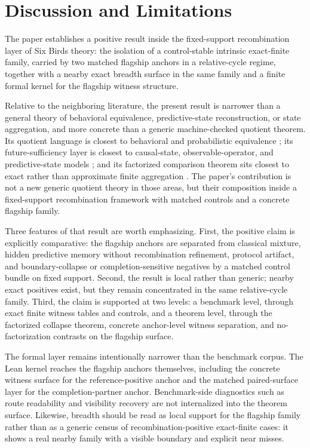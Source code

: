 \documentclass[11pt]{article}
\theoremstyle{definition}
\begin{document}
\section{Discussion and Limitations}

The paper establishes a positive result inside the fixed-support recombination layer of Six Birds theory: the isolation of a control-stable intrinsic exact-finite family, carried by two matched flagship anchors in a relative-cycle regime, together with a nearby exact breadth surface in the same family and a finite formal kernel for the flagship witness structure.

Relative to the neighboring literature, the present result is narrower than a general theory of behavioral equivalence, predictive-state reconstruction, or state aggregation, and more concrete than a generic machine-checked quotient theorem. Its quotient language is closest to behavioral and probabilistic equivalence \cite{Nerode1958,Park1981,LarsenSkou1991,Sangiorgi2011,vanGlabbeek2001}; its future-sufficiency layer is closest to causal-state, observable-operator, and predictive-state models \cite{CrutchfieldYoung1989,ShaliziCrutchfield2001,Jaeger2000,LittmanSuttonSingh2001}; and its factorized comparison theorem sits closest to exact rather than approximate finite aggregation \cite{KemenySnell1976,Buchholz1994,GivanDeanGreig2003,LiWalshLittman2006}. The paper’s contribution is not a new generic quotient theory in those areas, but their composition inside a fixed-support recombination framework with matched controls and a concrete flagship family.

Three features of that result are worth emphasizing. First, the positive claim is explicitly comparative: the flagship anchors are separated from classical mixture, hidden predictive memory without recombination refinement, protocol artifact, and boundary-collapse or completion-sensitive negatives by a matched control bundle on fixed support. Second, the result is local rather than generic; nearby exact positives exist, but they remain concentrated in the same relative-cycle family. Third, the claim is supported at two levels: a benchmark level, through exact finite witness tables and controls, and a theorem level, through the factorized collapse theorem, concrete anchor-level witness separation, and no-factorization contrasts on the flagship surface.

The formal layer remains intentionally narrower than the benchmark corpus. The Lean kernel reaches the flagship anchors themselves, including the concrete witness surface for the reference-positive anchor and the matched paired-surface layer for the completion-partner anchor. Benchmark-side diagnostics such as route readability and visibility recovery are not internalized into the theorem surface. Likewise, breadth should be read as local support for the flagship family rather than as a generic census of recombination-positive exact-finite cases: it shows a real nearby family with a visible boundary and explicit near misses.
\end{document}
